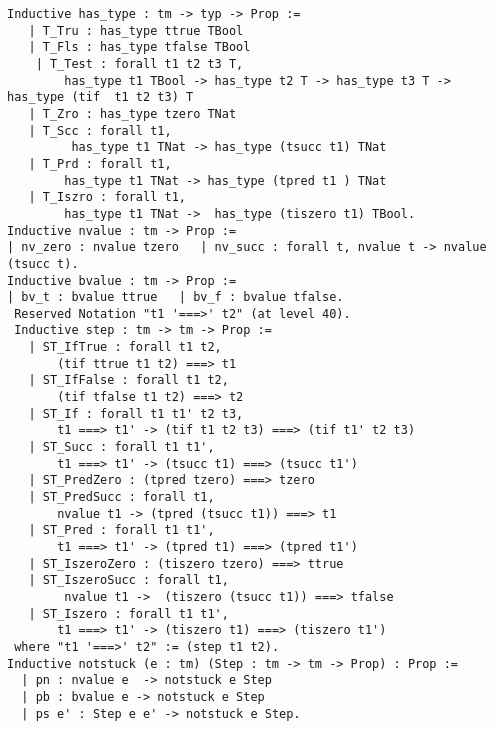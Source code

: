 \begin{lstlisting}
Inductive has_type : tm -> typ -> Prop :=
   | T_Tru : has_type ttrue TBool
   | T_Fls : has_type tfalse TBool
    | T_Test : forall t1 t2 t3 T,
        has_type t1 TBool -> has_type t2 T -> has_type t3 T ->  has_type (tif  t1 t2 t3) T 
   | T_Zro : has_type tzero TNat
   | T_Scc : forall t1,
         has_type t1 TNat -> has_type (tsucc t1) TNat
   | T_Prd : forall t1,
        has_type t1 TNat -> has_type (tpred t1 ) TNat
   | T_Iszro : forall t1,
        has_type t1 TNat ->  has_type (tiszero t1) TBool.
Inductive nvalue : tm -> Prop :=
| nv_zero : nvalue tzero   | nv_succ : forall t, nvalue t -> nvalue (tsucc t).
Inductive bvalue : tm -> Prop :=
| bv_t : bvalue ttrue   | bv_f : bvalue tfalse. 
 Reserved Notation "t1 '===>' t2" (at level 40).
 Inductive step : tm -> tm -> Prop :=
   | ST_IfTrue : forall t1 t2,
       (tif ttrue t1 t2) ===> t1
   | ST_IfFalse : forall t1 t2,
       (tif tfalse t1 t2) ===> t2
   | ST_If : forall t1 t1' t2 t3,
       t1 ===> t1' -> (tif t1 t2 t3) ===> (tif t1' t2 t3)
   | ST_Succ : forall t1 t1',
       t1 ===> t1' -> (tsucc t1) ===> (tsucc t1')
   | ST_PredZero : (tpred tzero) ===> tzero
   | ST_PredSucc : forall t1,
       nvalue t1 -> (tpred (tsucc t1)) ===> t1
   | ST_Pred : forall t1 t1',
       t1 ===> t1' -> (tpred t1) ===> (tpred t1')
   | ST_IszeroZero : (tiszero tzero) ===> ttrue
   | ST_IszeroSucc : forall t1,
        nvalue t1 ->  (tiszero (tsucc t1)) ===> tfalse
   | ST_Iszero : forall t1 t1',
       t1 ===> t1' -> (tiszero t1) ===> (tiszero t1')
 where "t1 '===>' t2" := (step t1 t2).
Inductive notstuck (e : tm) (Step : tm -> tm -> Prop) : Prop :=
  | pn : nvalue e  -> notstuck e Step
  | pb : bvalue e -> notstuck e Step
  | ps e' : Step e e' -> notstuck e Step.
\end{lstlisting}

